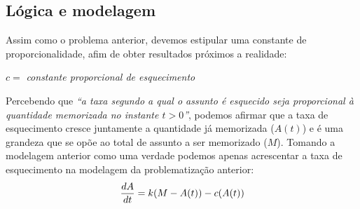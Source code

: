 \subsection{Lógica e modelagem}
Assim como o problema anterior, devemos estipular uma constante de proporcionalidade, afim de obter resultados próximos a realidade:
\begin{center}
	\noindent $c= $\textit{ constante proporcional de esquecimento\\}
\end{center}
Percebendo que \textit{“a taxa segundo a qual o assunto é esquecido seja proporcional à quantidade memorizada no instante $t > 0$”}, podemos afirmar que a taxa de esquecimento cresce juntamente a quantidade já memorizada ($A(t)$) e é uma grandeza que se opõe ao total de assunto a ser memorizado ($M$).
Tomando a modelagem anterior como uma verdade podemos apenas acrescentar a taxa de esquecimento na modelagem da problematização anterior:
\begin{equation}
\boldmath
\frac{dA}{dt} = k(M- A(t)) - c(A(t))
\end{equation}
